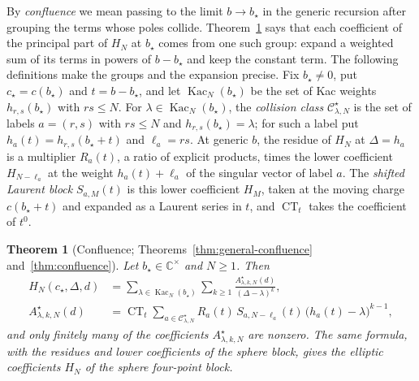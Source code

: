\documentclass[twoside,10pt]{article}
\numberwithin{equation}{section}
\theoremstyle{slbody}
\newtheorem{introtheorem}{Theorem}
\theoremstyle{definition}
\theoremstyle{remark}
\newcommand{\CT}{\operatorname{CT}}
\begin{document}
By \emph{confluence} we mean passing to the limit \(b\to b_\star\) in the
generic recursion after grouping the terms whose poles collide.
Theorem~\ref{thm:intro-confluence} says that each coefficient of the
principal part of \(H_N\) at \(b_\star\) comes from one such group: expand a
weighted sum of its terms in powers of \(b-b_\star\) and keep the constant
term.  The
following definitions make the groups and the expansion precise.  Fix
\(b_\star\neq0\), put \(c_\star=c(b_\star)\) and \(t=b-b_\star\), and let
\(\operatorname{Kac}_N(b_\star)\) be the set of Kac weights
\(h_{r,s}(b_\star)\) with \(rs\leq N\).  For
\(\lambda\in\operatorname{Kac}_N(b_\star)\), the \emph{collision class}
\({\mathcal C}^\star_{\lambda,N}\) is the set of labels \(a=(r,s)\) with
\(rs\leq N\) and \(h_{r,s}(b_\star)=\lambda\); for such a label put
\(h_a(t)=h_{r,s}(b_\star+t)\) and \(\ell_a=rs\).  At generic \(b\), the
residue of \(H_N\) at \(\Delta=h_a\) is a multiplier \(R_a(t)\), a ratio of
explicit products, times the lower coefficient \(H_{N-\ell_a}\) at the weight
\(h_a(t)+\ell_a\) of the singular vector of label \(a\).  The \emph{shifted
Laurent block} \(S_{a,M}(t)\) is this lower coefficient \(H_M\), taken at the
moving charge \(c(b_\star+t)\) and expanded as a Laurent series in \(t\), and
\(\CT_t\) takes the coefficient of \(t^0\).

\begin{introtheorem}[Confluence; Theorems~\ref{thm:general-confluence}
and~\ref{thm:confluence}]\label{thm:intro-confluence}
Let \(b_\star\in\mathbb C^\times\) and \(N\geq1\).  Then
\begin{equation}\label{eq:intro-main}
 \begin{aligned}
 H_N(c_\star,\Delta,d)
 &=\sum_{\lambda\in\operatorname{Kac}_N(b_\star)}
   \sum_{k\geq1}
 \frac{A^\star_{\lambda,k,N}(d)}{(\Delta-\lambda)^k},\\
 A^\star_{\lambda,k,N}(d)
 &=\CT_t
 \sum_{a\in{\mathcal C}^\star_{\lambda,N}}
 R_a(t)\,S_{a,N-\ell_a}(t)\,
 \bigl(h_a(t)-\lambda\bigr)^{k-1},
 \end{aligned}
\end{equation}
and only finitely many of the coefficients \(A^\star_{\lambda,k,N}\) are
nonzero.  The same formula, with the residues and lower coefficients of the
sphere block, gives the elliptic coefficients \(H_N\) of the sphere
four-point block.
\end{introtheorem}
\end{document}
